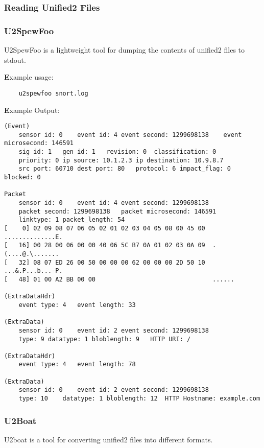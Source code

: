 \documentclass[english]{report}
\begin{document}
\subsubsection{Reading Unified2 Files}

\subsubsection{U2SpewFoo}

U2SpewFoo is a lightweight tool for dumping the contents of unified2 files to stdout.
  
\textbf Example usage:

\begin{verbatim}    
    u2spewfoo snort.log
\end{verbatim}


\textbf Example Output:

\begin{verbatim}
(Event)
    sensor id: 0    event id: 4 event second: 1299698138    event microsecond: 146591
    sig id: 1   gen id: 1   revision: 0  classification: 0
    priority: 0 ip source: 10.1.2.3 ip destination: 10.9.8.7
    src port: 60710 dest port: 80   protocol: 6 impact_flag: 0  blocked: 0

Packet
    sensor id: 0    event id: 4 event second: 1299698138
    packet second: 1299698138   packet microsecond: 146591
    linktype: 1 packet_length: 54
[    0] 02 09 08 07 06 05 02 01 02 03 04 05 08 00 45 00  ..............E.
[   16] 00 28 00 06 00 00 40 06 5C B7 0A 01 02 03 0A 09  .(....@.\.......
[   32] 08 07 ED 26 00 50 00 00 00 62 00 00 00 2D 50 10  ...&.P...b...-P.
[   48] 01 00 A2 BB 00 00                                ......

(ExtraDataHdr)
    event type: 4   event length: 33

(ExtraData)
    sensor id: 0    event id: 2 event second: 1299698138
    type: 9 datatype: 1 bloblength: 9   HTTP URI: /

(ExtraDataHdr)
    event type: 4   event length: 78

(ExtraData)
    sensor id: 0    event id: 2 event second: 1299698138
    type: 10    datatype: 1 bloblength: 12  HTTP Hostname: example.com 
\end{verbatim}

\subsubsection{U2Boat}

U2boat is a tool for converting unified2 files into different formats.
\end{document}

